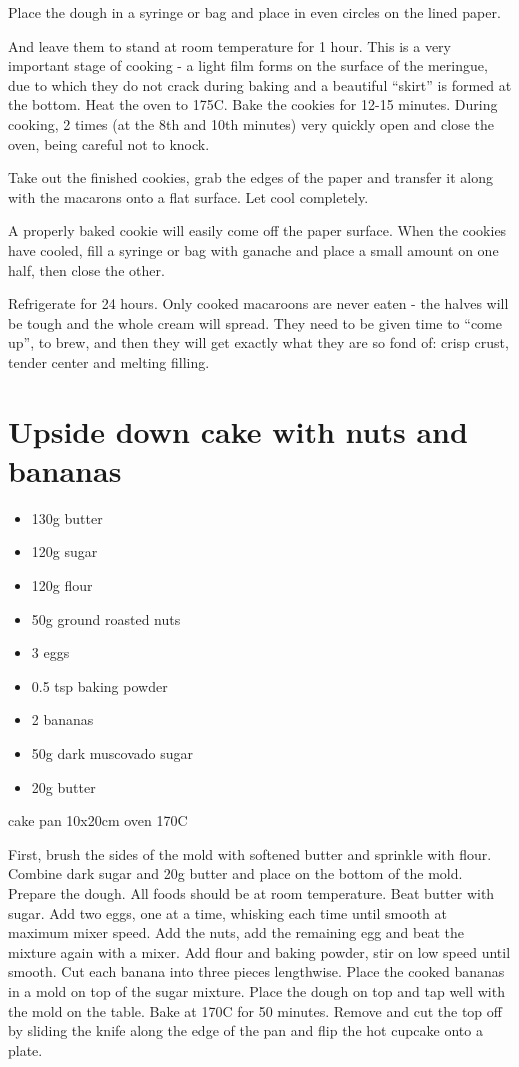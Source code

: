 \documentclass[
]{book}
\begin{document}
Place the dough in a syringe or bag and place in even circles on the lined paper.

And leave them to stand at room temperature for 1 hour. This is a very important stage of cooking - a light film forms on the surface of the meringue, due to which they do not crack during baking and a beautiful ``skirt'' is formed at the bottom.
Heat the oven to 175C.
Bake the cookies for 12-15 minutes. During cooking, 2 times (at the 8th and 10th minutes) very quickly open and close the oven, being careful not to knock.

Take out the finished cookies, grab the edges of the paper and transfer it along with the macarons onto a flat surface. Let cool completely.

A properly baked cookie will easily come off the paper surface.
When the cookies have cooled, fill a syringe or bag with ganache and place a small amount on one half, then close the other.

Refrigerate for 24 hours. Only cooked macaroons are never eaten - the halves will be tough and the whole cream will spread. They need to be given time to ``come up'', to brew, and then they will get exactly what they are so fond of: crisp crust, tender center and melting filling.

\hypertarget{upside-down-cake-with-nuts-and-bananas}{%
\section{Upside down cake with nuts and bananas}\label{upside-down-cake-with-nuts-and-bananas}}

\begin{itemize}
\item
  130g butter
\item
  120g sugar
\item
  120g flour
\item
  50g ground roasted nuts
\item
  3 eggs
\item
  0.5 tsp baking powder
\item
  2 bananas
\item
  50g dark muscovado sugar
\item
  20g butter
\end{itemize}

cake pan 10x20cm
oven 170C

First, brush the sides of the mold with softened butter and sprinkle with flour. Combine dark sugar and 20g butter and place on the bottom of the mold.
Prepare the dough. All foods should be at room temperature. Beat butter with sugar.
Add two eggs, one at a time, whisking each time until smooth at maximum mixer speed.
Add the nuts, add the remaining egg and beat the mixture again with a mixer.
Add flour and baking powder, stir on low speed until smooth.
Cut each banana into three pieces lengthwise. Place the cooked bananas in a mold on top of the sugar mixture.
Place the dough on top and tap well with the mold on the table.
Bake at 170C for 50 minutes.
Remove and cut the top off by sliding the knife along the edge of the pan and flip the hot cupcake onto a plate.
\end{document}
